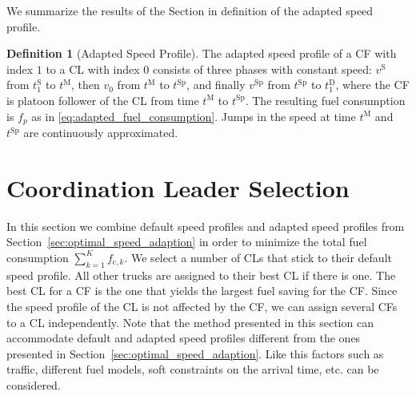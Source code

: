 \documentclass[letterpaper,10pt,conference,twocolumn]{IEEEtran}
\newcommand{\op}[1]{\mathrm{#1}}
\theoremstyle{definition}
\newtheorem{defi}{Definition}
\begin{document}
We summarize the results of the Section in definition of the adapted speed profile.
\begin{defi}[Adapted Speed Profile]
 The adapted speed profile of a CF with index $1$ to a CL with index $0$ consists of three phases with constant speed: $v^\op{S}$ from $t_1^\op{S}$ to $t^\op{M}$, then $v_0$ from $t^\op{M}$ to $t^\op{Sp}$, and finally $v^\op{Sp}$ from $t^\op{Sp}$ to $t_1^\op{D}$, where the CF is platoon follower of the CL from time $t^\op{M}$ to $t^\op{Sp}$. The resulting fuel consumption is $f_{p}$ as in \eqref{eq:adapted_fuel_consumption}. Jumps in the speed at time $t^\op{M}$ and $t^\op{Sp}$ are continuously approximated.
\end{defi}
 
\section{Coordination Leader Selection}
\label{sec:graph_based_clustering}

In this section we combine default speed profiles and adapted speed profiles from Section~\ref{sec:optimal_speed_adaption} in order to minimize the total fuel consumption $\sum\limits_{k = 1}^K f_{\op{c},k}$. We select a number of CLs that stick to their default speed profile. All other trucks are assigned to their best CL if there is one. The best CL for a CF is the one that yields the largest fuel saving for the CF. Since the speed profile of the CL is not affected by the CF, we can assign several CFs to a CL independently. Note that the method presented in this section can accommodate default and adapted speed profiles different from the ones presented in Section~\ref{sec:optimal_speed_adaption}. Like this factors such as traffic, different fuel models, soft constraints on the arrival time, etc. can be considered.
\end{document}
